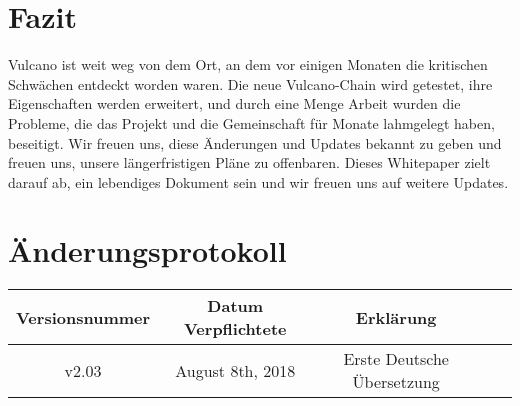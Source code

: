 \documentclass[A4paper, 12pt]{article}
\begin{document}
\section{Fazit}
Vulcano ist weit weg von dem Ort, an dem vor einigen Monaten die kritischen Schwächen entdeckt worden waren. Die neue Vulcano-Chain wird getestet, ihre Eigenschaften werden erweitert, und durch eine Menge Arbeit wurden die Probleme, die das Projekt und die Gemeinschaft für Monate lahmgelegt haben, beseitigt. Wir freuen uns, diese Änderungen und Updates bekannt zu geben und freuen uns, unsere längerfristigen Pläne zu offenbaren. Dieses Whitepaper zielt darauf ab, ein lebendiges Dokument sein und wir freuen uns auf weitere Updates. 

\newpage
\section{Änderungsprotokoll}

\begin{table}[h]
\centering
\begin{tabular}{@{}ccccc@{}}
\toprule
Versionsnummer & Datum Verpflichtete & Erklärung \\ \midrule
v2.03 & August 8th, 2018 & Erste Deutsche Übersetzung \\
 \bottomrule
\end{tabular}
\end{table}
\end{document}

